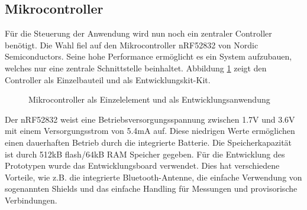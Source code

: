 \subsection{Mikrocontroller} \label{sec:microcontrollerHardware}
Für die Steuerung der Anwendung wird nun noch ein zentraler Controller benötigt. Die Wahl fiel auf den Mikrocontroller nRF52832 von Nordic Semiconductors. Seine hohe Performance ermöglicht es ein System aufzubauen, welches nur eine zentrale Schnittstelle beinhaltet. Abbildung \ref{fig:nRF52832} zeigt den Controller als Einzelbauteil und als Entwicklungskit-Kit.


\begin{figure}[htbp]
	\centering
	\quad
	\quad
	\caption[Mikrocontroller NRF52832]{Mikrocontroller als Einzelelement und als Entwicklungsanwendung}
	\label{fig:nRF52832}
\end{figure}

Der nRF52832 weist eine Betriebsversorgungsspannung zwischen 1.7V und 3.6V mit einem Versorgungsstrom von 5.4mA auf. Diese niedrigen Werte ermöglichen einen dauerhaften Betrieb durch die integrierte Batterie. Die Speicherkapazität ist durch 512kB flash/64kB RAM Speicher gegeben. Für die Entwicklung des Prototypen wurde das Entwicklungsboard verwendet. Dies hat verschiedene Vorteile, wie z.B. die integrierte Bluetooth-Antenne, die einfache Verwendung von sogenannten Shields und das einfache Handling für Messungen und provisorische Verbindungen.